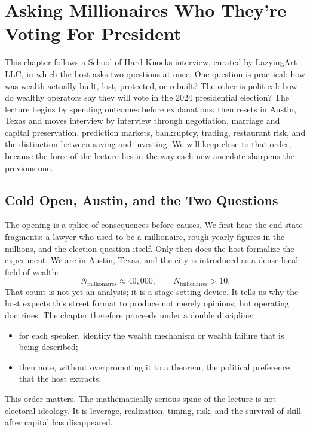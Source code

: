 \chapter{Asking Millionaires Who They're Voting For President}

This chapter follows a School of Hard Knocks interview, curated by LazyingArt LLC, in which the host asks two questions at once. One question is practical: how was wealth actually built, lost, protected, or rebuilt? The other is political: how do wealthy operators say they will vote in the 2024 presidential election? The lecture begins by spending outcomes before explanations, then resets in Austin, Texas and moves interview by interview through negotiation, marriage and capital preservation, prediction markets, bankruptcy, trading, restaurant risk, and the distinction between saving and investing. We will keep close to that order, because the force of the lecture lies in the way each new anecdote sharpens the previous one.

\section{Cold Open, Austin, and the Two Questions}

The opening is a splice of consequences before causes. We first hear the end-state fragments: a lawyer who used to be a millionaire, rough yearly figures in the millions, and the election question itself. Only then does the host formalize the experiment. We are in Austin, Texas, and the city is introduced as a dense local field of wealth:
\begin{equation}
N_{\text{millionaires}} \approx 40{,}000,\qquad
N_{\text{billionaires}} > 10.
\end{equation}
That count is not yet an analysis; it is a stage-setting device. It tells us why the host expects this street format to produce not merely opinions, but operating doctrines. The chapter therefore proceeds under a double discipline:
\begin{itemize}
\item for each speaker, identify the wealth mechanism or wealth failure that is being described;
\item then note, without overpromoting it to a theorem, the political preference that the host extracts.
\end{itemize}

This order matters. The mathematically serious spine of the lecture is not electoral ideology. It is leverage, realization, timing, risk, and the survival of skill after capital has disappeared.

